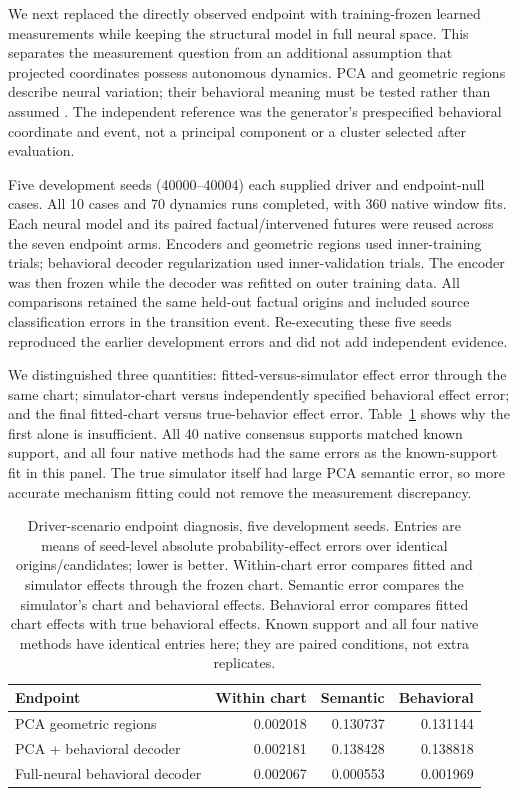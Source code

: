 We next replaced the directly observed endpoint with training-frozen learned
measurements while keeping the structural model in full neural space. This
separates the measurement question from an additional assumption that projected
coordinates possess autonomous dynamics. PCA and geometric regions describe
neural variation; their behavioral meaning must be tested rather than assumed
\citep{jolliffe2016pca}. The independent reference was the generator's
prespecified behavioral coordinate and event, not a principal component or a
cluster selected after evaluation.

Five development seeds (40000--40004) each supplied driver and endpoint-null
cases. All 10 cases and 70 dynamics runs completed, with 360 native window fits.
Each neural model and its paired factual/intervened futures were reused across
the seven endpoint arms. Encoders and geometric regions used inner-training
trials; behavioral decoder regularization used inner-validation trials. The
encoder was then frozen while the decoder was refitted on outer training data.
All comparisons retained the same held-out factual origins and included source
classification errors in the transition event. Re-executing these five seeds
reproduced the earlier development errors and did not add independent evidence.

We distinguished three quantities: fitted-versus-simulator effect error through
the same chart; simulator-chart versus independently specified behavioral
effect error; and the final fitted-chart versus true-behavior effect error.
Table~\ref{tab:developmentendpointdiagnosis} shows why the first alone is
insufficient. All 40 native consensus supports matched known support, and all
four native methods had the same errors as the known-support fit in this panel.
The true simulator itself had large PCA semantic error, so more accurate
mechanism fitting could not remove the measurement discrepancy.

\begin{table}[htbp]
\centering\small
\caption{Driver-scenario endpoint diagnosis, five development seeds. Entries
are means of seed-level absolute probability-effect errors over identical
origins/candidates; lower is better. Within-chart error compares fitted and
simulator effects through the frozen chart. Semantic error compares the
simulator's chart and behavioral effects. Behavioral error compares fitted chart
effects with true behavioral effects. Known support and all four native methods
have identical entries here; they are paired conditions, not extra replicates.}
\label{tab:developmentendpointdiagnosis}
\begin{tabular}{@{}lrrr@{}}
\toprule
Endpoint & Within chart & Semantic & Behavioral \\
\midrule
PCA geometric regions & 0.002018 & 0.130737 & 0.131144 \\
PCA + behavioral decoder & 0.002181 & 0.138428 & 0.138818 \\
Full-neural behavioral decoder & 0.002067 & 0.000553 & 0.001969 \\
\bottomrule
\end{tabular}
\end{table}

